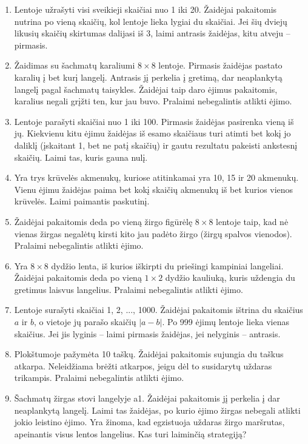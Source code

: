 \documentclass[11pt,a4paper]{scrartcl}
\begin{document}
\begin{enumerate}
    \item Lentoje užrašyti visi sveikieji skaičiai nuo 1 iki 20. Žaidėjai pakaitomis nutrina po vieną skaičių, kol lentoje lieka lygiai du skaičiai. Jei šių dviejų likusių skaičių skirtumas dalijasi iš 3, laimi antrasis žaidėjas, kitu atveju – pirmasis.
    \item Žaidimas su šachmatų karaliumi $8 \times 8$ lentoje. Pirmasis žaidėjas pastato karalių į bet kurį langelį. Antrasis jį perkelia į gretimą, dar neaplankytą langelį pagal šachmatų taisykles. Žaidėjai taip daro ėjimus pakaitomis, karalius negali grįžti ten, kur jau buvo. Pralaimi nebegalintis atlikti ėjimo.
    \item Lentoje parašyti skaičiai nuo 1 iki 100. Pirmasis žaidėjas pasirenka vieną iš jų. Kiekvienu kitu ėjimu žaidėjas iš esamo skaičiaus turi atimti bet kokį jo daliklį (įskaitant 1, bet ne patį skaičių) ir gautu rezultatu pakeisti ankstesnį skaičių. Laimi tas, kuris gauna nulį.
    \item Yra trys krūvelės akmenukų, kuriose atitinkamai yra 10, 15 ir 20 akmenukų. Vienu ėjimu žaidėjas paima bet kokį skaičių akmenukų iš bet kurios vienos krūvelės. Laimi paimantis paskutinį.
    \item Žaidėjai pakaitomis deda po vieną žirgo figūrėlę $8 \times 8$ lentoje taip, kad nė vienas žirgas negalėtų kirsti kito jau padėto žirgo (žirgų spalvos vienodos). Pralaimi nebegalintis atlikti ėjimo.
    \item Yra $8 \times 8$ dydžio lenta, iš kurios iškirpti du priešingi kampiniai langeliai. Žaidėjai pakaitomis deda po vieną $1 \times 2$ dydžio kauliuką, kuris uždengia du gretimus laisvus langelius. Pralaimi nebegalintis atlikti ėjimo.
    \item Lentoje surašyti skaičiai 1, 2, ..., 1000. Žaidėjai pakaitomis ištrina du skaičius $a$ ir $b$, o vietoje jų parašo skaičių $|a-b|$. Po 999 ėjimų lentoje lieka vienas skaičius. Jei jis lyginis – laimi pirmasis žaidėjas, jei nelyginis – antrasis.
    \item Plokštumoje pažymėta 10 taškų. Žaidėjai pakaitomis sujungia du taškus atkarpa. Neleidžiama brėžti atkarpos, jeigu dėl to susidarytų uždaras trikampis. Pralaimi nebegalintis atlikti ėjimo.
    \item Šachmatų žirgas stovi langelyje a1. Žaidėjai pakaitomis jį perkelia į dar neaplankytą langelį. Laimi tas žaidėjas, po kurio ėjimo žirgas nebegali atlikti jokio leistino ėjimo. Yra žinoma, kad egzistuoja uždaras žirgo maršrutas, apeinantis visus lentos langelius. Kas turi laiminčią strategiją?
\end{enumerate}
\end{document}
